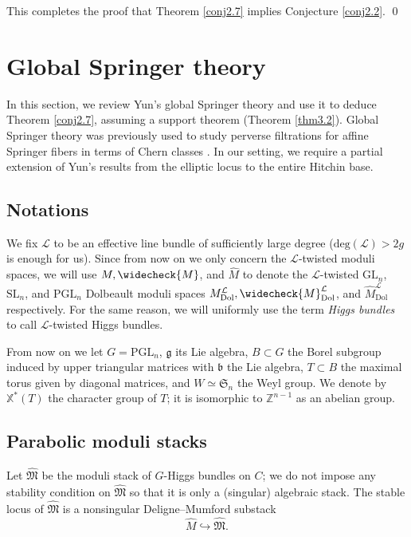 \documentclass[11pt]{amsart}
\theoremstyle{plain}
\theoremstyle{definition}
\theoremstyle{remark}
\newcommand{\BX}{{\mathbb{X}}}
\newcommand{\BZ}{{\mathbb{Z}}}
\newcommand{\CL}{{\mathcal L}}
\newcommand{\FM}{{\mathfrak{M}}}
\begin{document}
This completes the proof that Theorem \ref{conj2.7} implies Conjecture \ref{conj2.2}. \qed




\section{Global Springer theory}

In this section, we review Yun's global Springer theory \cite{Yun1, Yun2, Yun3} and use it to deduce Theorem \ref{conj2.7}, assuming a support theorem (Theorem \ref{thm3.2}). Global Springer theory was previously used to study perverse filtrations for affine Springer fibers in terms of Chern classes \cite{OY, OY2}.  In our setting, we require a partial extension of Yun's results from the elliptic locus to the entire Hitchin base.

\subsection{Notations}
We fix $\CL$ to be an effective line bundle of sufficiently large degree
($\mathrm{deg}\left(\CL\right)> 2g$ is enough for us).
 Since from now on we only concern the $\CL$-twisted moduli spaces, we will use $M, \widecheck{M}$, and $\widehat{M}$ to denote the $\CL$-twisted $\mathrm{GL}_n$, $\mathrm{SL}_n$, and $\mathrm{PGL}_n$ Dolbeault moduli spaces $M^\CL_{\mathrm{Dol}}, \widecheck{M}^\CL_{\mathrm{Dol}}$, and $\widehat{M}^\CL_{\mathrm{Dol}}$ respectively. For the same reason, we will uniformly use the term \emph{Higgs bundles} to call $\CL$-twisted Higgs bundles.

From now on we let $G = \mathrm{PGL}_n$, $\mathfrak{g}$ its Lie algebra, $B \subset G$ the Borel subgroup induced by upper triangular matrices with $\mathfrak{b}$ the Lie algebra, $T\subset B$ the maximal torus given by diagonal matrices, and $W \simeq \mathfrak{S}_n$ the Weyl group. We denote by $\BX^*(T)$ the character group of $T$; it is isomorphic to $\BZ^{n-1}$ as an abelian group.




\subsection{Parabolic moduli stacks}

Let $\widehat{\FM}$ be the moduli stack of $G$-Higgs bundles on $C$; we do not impose any stability condition on $\widehat{\FM}$ so that it is only a (singular) algebraic stack. The stable locus of $\widehat{\FM}$ is a nonsingular Deligne--Mumford substack
\[
\widehat{M} \hookrightarrow \widehat{\FM}.
\]
\end{document}
